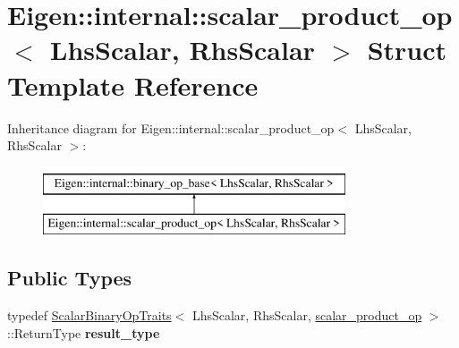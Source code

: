 \hypertarget{struct_eigen_1_1internal_1_1scalar__product__op}{}\section{Eigen\+::internal\+::scalar\+\_\+product\+\_\+op$<$ Lhs\+Scalar, Rhs\+Scalar $>$ Struct Template Reference}
\label{struct_eigen_1_1internal_1_1scalar__product__op}
Inheritance diagram for Eigen\+::internal\+::scalar\+\_\+product\+\_\+op$<$ Lhs\+Scalar, Rhs\+Scalar $>$\+:\begin{figure}[H]
\begin{center}
\leavevmode
\includegraphics[height=2.000000cm]{struct_eigen_1_1internal_1_1scalar__product__op}
\end{center}
\end{figure}
\subsection*{Public Types}
\begin{DoxyCompactItemize}
\item 
\mbox{\label{struct_eigen_1_1internal_1_1scalar__product__op_a2a231bb9be50152f9dd0f29b7e084f75}} 
typedef \mbox{\hyperlink{struct_eigen_1_1_scalar_binary_op_traits}{Scalar\+Binary\+Op\+Traits}}$<$ Lhs\+Scalar, Rhs\+Scalar, \mbox{\hyperlink{struct_eigen_1_1internal_1_1scalar__product__op}{scalar\+\_\+product\+\_\+op}} $>$\+::Return\+Type {\bfseries result\+\_\+type}
\end{DoxyCompactItemize}
